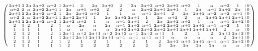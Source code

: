 \documentclass{article}
\numberwithin{equation}{section}
\begin{document}
\begin{enumerate}
\[\begin{pmatrix}
\begin{smallmatrix}
		2\alpha + 1 & 2 & 2\alpha & 2\alpha + 2 & \alpha + 2 & 1 & 2\alpha + 1 & 2 & 2\alpha & 2\alpha + 2 & 2 & 2\alpha & 2\alpha + 2 & \alpha + 2 & 2\alpha + 2 & \alpha + 2 & 1 & \alpha & \alpha + 2 & 1 & \vline & 0 \\
		\alpha + 2 & 2 & \alpha & 2\alpha + 2 & 2\alpha + 1 & 1 & 2\alpha & \alpha + 1 & \alpha + 2 & 2 & 2 & \alpha & 2\alpha + 2 & 2\alpha + 1 & 2\alpha + 1 & 1 & 2\alpha & \alpha + 1 & 2\alpha + 2 & 2\alpha & \vline & 0 \\
		2\alpha + 1 & 2 & 2\alpha & 2\alpha + 2 & \alpha + 2 & 1 & 2\alpha & 2\alpha + 2 & \alpha + 2 & 1 & 1 & \alpha & \alpha + 1 & 2\alpha + 1 & 2 & 2\alpha & 2\alpha + 2 & \alpha + 2 & \alpha + 2 & \alpha + 1 & \vline & 0 \\
		\alpha + 2 & 2 & \alpha & 2\alpha + 2 & 2\alpha + 1 & 1 & 2\alpha + 2 & 2\alpha + 1 & 1 & 2\alpha & 2\alpha + 2 & 2\alpha + 1 & 1 & 2\alpha & \alpha + 2 & 2 & \alpha & 2\alpha + 2 & 2\alpha + 1 & 2\alpha + 1 & \vline & 0 \\
		2\alpha + 1 & 2 & 2\alpha & 2\alpha + 2 & \alpha + 2 & 1 & 2\alpha + 2 & \alpha + 2 & 1 & \alpha & \alpha + 1 & 2\alpha + 1 & 2 & 2\alpha & 2\alpha + 2 & \alpha + 2 & 1 & \alpha & \alpha + 1 & 2\alpha + 2 & \vline & 0 \\
		2 & 1 & 2 & 1 & 2 & 1 & \alpha & 2\alpha & \alpha & 2\alpha & \alpha + 1 & 2\alpha + 2 & \alpha + 1 & 2\alpha + 2 & 2\alpha + 2 & \alpha + 1 & 2\alpha + 2 & \alpha + 1 & \alpha + 2 & 1 & \vline & 0 \\
		1 & 1 & 1 & 1 & 1 & 1 & \alpha & \alpha & \alpha & \alpha & 2\alpha + 2 & 2\alpha + 2 & 2\alpha + 2 & 2\alpha + 2 & 2\alpha + 1 & 2\alpha + 1 & 2\alpha + 1 & 2\alpha + 1 & 2 & \alpha & \vline & 0 \\
		2 & 1 & 2 & 1 & 2 & 1 & 2\alpha + 1 & \alpha + 2 & 2\alpha + 1 & \alpha + 2 & 2\alpha + 2 & \alpha + 1 & 2\alpha + 2 & \alpha + 1 & 1 & 2 & 1 & 2 & 2\alpha + 1 & 2\alpha + 2 & \vline & 0 \\
		1 & 1 & 1 & 1 & 1 & 1 & 2\alpha + 1 & 2\alpha + 1 & 2\alpha + 1 & 2\alpha + 1 & \alpha + 1 & \alpha + 1 & \alpha + 1 & \alpha + 1 & \alpha & \alpha & \alpha & \alpha & 2 & 2\alpha + 1 & \vline & 0 \\
		2 & 1 & 2 & 1 & 2 & 1 & 2 & 1 & 2 & 1 & 1 & 2 & 1 & 2 & 2\alpha + 2 & \alpha + 1 & 2\alpha + 2 & \alpha + 1 & \alpha + 1 & 2\alpha + 2 & \vline & 0 \\
		1 & 1 & 1 & 1 & 1 & 1 & 2 & 2 & 2 & 2 & 2 & 2 & 2 & 2 & 2\alpha & 2\alpha & 2\alpha & 2\alpha & \alpha & \alpha & \vline & 0 \\

\end{smallmatrix}
\end{pmatrix}\]
\end{enumerate}
\end{document}
